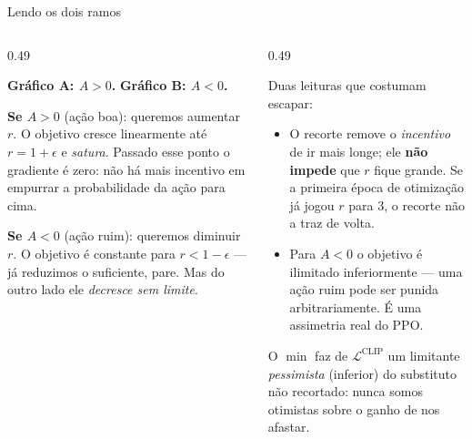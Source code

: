 \documentclass[aspectratio=169, 10pt]{beamer}
\newcommand{\Adv}{A}
\newcommand{\Lclip}{\mathcal{L}^{\mathrm{CLIP}}}
\begin{document}
\begin{frame}{Lendo os dois ramos}

  \begin{columns}[T]
  \begin{column}{0.49\textwidth}
    \begin{respbox}
      \textbf{Gráfico A: $\Adv>0$.} \; \textbf{Gráfico B: $\Adv<0$.}
    \end{respbox}
    \smallskip
    {\small
    \textbf{Se $\Adv>0$} (ação boa): queremos aumentar $r$. O objetivo cresce
    linearmente até $r = 1+\epsilon$ e \emph{satura}. Passado esse ponto o gradiente
    é zero: não há mais incentivo em empurrar a probabilidade da ação para cima.
    \par\smallskip
    \textbf{Se $\Adv<0$} (ação ruim): queremos diminuir $r$. O objetivo é constante
    para $r < 1-\epsilon$ --- já reduzimos o suficiente, pare. Mas do outro lado ele
    \emph{decresce sem limite}.}
  \end{column}
  \begin{column}{0.49\textwidth}
    \begin{alertabox}
      Duas leituras que costumam escapar:
      \begin{itemize}\setlength{\itemsep}{0.15ex}
        \item O recorte remove o \emph{incentivo} de ir mais longe; ele \textbf{não
          impede} que $r$ fique grande. Se a primeira época de otimização já jogou
          $r$ para $3$, o recorte não a traz de volta.
        \item Para $\Adv<0$ o objetivo é ilimitado inferiormente --- uma ação ruim
          pode ser punida arbitrariamente. É uma assimetria real do PPO.
      \end{itemize}
    \end{alertabox}
    \begin{ideiabox}
      O $\min$ faz de $\Lclip$ um limitante \emph{pessimista} (inferior) do
      substituto não recortado: nunca somos otimistas sobre o ganho de nos afastar.
    \end{ideiabox}
  \end{column}
  \end{columns}
\end{frame}
\end{document}
